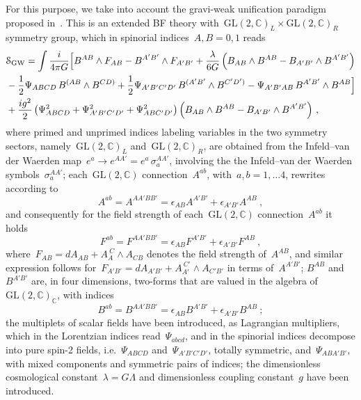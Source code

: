 \documentclass[reqno,11pt]{amsart}
\numberwithin{equation}{section}
\newcommand{\1}{\mbox{\rm 1 \hspace{-1.05 em} 1}}
\begin{document}
\begin{enumerate}[leftmargin=2em]
For this purpose, we take into account the gravi-weak unification paradigm proposed in~\cite{Alexander_2014}. This is an extended BF theory with~$\text{GL}(2, \mathbb{C})_L\times \text{GL}(2, \mathbb{C})_R$ symmetry group, which in spinorial indices~$A,B=0,1$ reads
\begin{align*}
&\mathcal{S}_{\rm GW} =\int \frac{i}{4\pi G} \Big[ B^{AB} \wedge F_{AB} - B^{A'B'} \wedge F_{A'B'}  + \frac{\lambda}{6G}   \left( B_{AB} \wedge B^{AB} - B_{A'B'} \wedge B^{A'B'}   \right) \nonumber \\
&-\frac{1}{2} \Psi_{ABCD} \, B^{(AB} \wedge B^{CD)} + \frac{1}{2} \Psi_{A'B'C'D'} \, B^{(A'B'} \wedge B^{C'D')}- \Psi_{A'B'AB} \, B^{A'B'} \wedge B^{AB} \Big] \nonumber \\
&+ \frac{i g^2}{2} \left( \Psi^2_{ABCD} + \Psi^2_{A'B'C'D'} + \Psi^2_{ABC'D'} \right)  \left( B_{AB} \wedge B^{AB} - B_{A'B'} \wedge B^{A'B'}   \right)\,,
\end{align*}
where primed and unprimed indices labeling variables in the two symmetry sectors, namely~$\text{GL}(2, \mathbb{C})_L$ and~$\text{GL}(2, \mathbb{C})_R$, are obtained from the Infeld--van der Waerden map~$e^a \rightarrow e^{AA'}=e^a \, \sigma^{AA'}_a$, involving the the Infeld--van der Waerden symbols~$\sigma^{AA'}_a$; each~$\text{GL}(2, \mathbb{C})$ connection~$A^{ab}$, with~$a,b=1,\dots 4$, rewrites according to
\[ A^{ab}= A^{AA'BB'}= \epsilon_{AB} A^{A'B'} +  \epsilon_{A'B'} A^{AB} \:, \]
and consequently for the field strength of each~$\text{GL}(2, \mathbb{C})$ connection~$A^{ab}$ it holds
\[ F^{ab}= F^{AA'BB'}= \epsilon_{AB} F^{A'B'} +  \epsilon_{A'B'} F^{AB} \:, \]
where~$F_{AB}=dA_{AB}+A_A^{\ C} \wedge A_{CB}$ denotes the field strength of~$A^{AB}$, and similar expression follows for~$F_{A'B'}=dA_{A'B'}+A_{A'}^{\ C'} \wedge A_{C'B'}$ in terms of~$A^{A'B'}$; $B^{AB}$ and~$B^{A'B'}$ are, in four dimensions, two-forms that are valued in the algebra of~$\text{GL}(2, \mathbb{C})_\mathbb{C}$, with indices 
\[ B^{ab}= B^{AA'BB'}= \epsilon_{AB} B^{A'B'} +  \epsilon_{A'B'} B^{AB} \:; \]
the multiplets of scalar fields have been introduced, as Lagrangian multipliers, which in the Lorentzian indices read~$\Psi_{abcd}$, and in the spinorial indices decompose into pure spin-2 fields, i.e.\ $\Psi_{ABCD}$ and~$\Psi_{A'B'C'D'}$, totally symmetric, and~$\Psi_{ABA'B'}$, with mixed components and symmetric pairs of indices; the dimensionless cosmological constant~$\lambda=G\Lambda$ and dimensionless coupling constant~$g$ have been introduced.


\end{enumerate}
\end{document}

